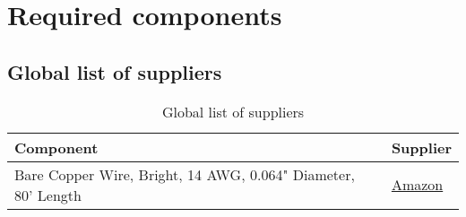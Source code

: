 \section{Required components}
\label{sec:required-components}

\subsection{Global list of suppliers}
\label{sec:global-list-of-suppliers}

\begin{table}[h]
\begin{center}
    \begin{tabular}{ | l | l |} \hline
    Component & Supplier \\ \hline
    Bare Copper Wire, Bright, 14 AWG, 0.064" Diameter, 80' Length  &  
    \href{http://www.amazon.com/Copper-Bright-0-064-Diameter-Length/dp/B000IJYRDE/ref=sr_1_15?ie=UTF8&qid=1446585445&sr=8-15&keywords=awg+14+copper}{Amazon}  \\ \hline

    \end{tabular}
    \caption{Global list of suppliers}
	\label{table:global-list-suppliers}
\end{center}
\end{table}